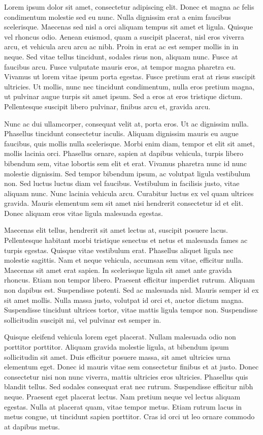 \documentclass[sigconf]{acmart}
\begin{document}
Lorem ipsum dolor sit amet, consectetur adipiscing elit. Donec et magna ac felis condimentum molestie sed eu nunc. Nulla dignissim erat a enim faucibus scelerisque. Maecenas sed nisl a orci aliquam tempus sit amet et ligula. Quisque vel rhoncus odio. Aenean euismod, quam a suscipit placerat, nisl eros viverra arcu, et vehicula arcu arcu ac nibh. Proin in erat ac est semper mollis in in neque. Sed vitae tellus tincidunt, sodales risus non, aliquam nunc. Fusce at faucibus arcu. Fusce vulputate mauris eros, at tempor magna pharetra eu. Vivamus ut lorem vitae ipsum porta egestas. Fusce pretium erat at risus suscipit ultricies. Ut mollis, nunc nec tincidunt condimentum, nulla eros pretium magna, ut pulvinar augue turpis sit amet ipsum. Sed a eros at eros tristique dictum. Pellentesque suscipit libero pulvinar, finibus arcu et, gravida arcu.

Nunc ac dui ullamcorper, consequat velit at, porta eros. Ut ac dignissim nulla. Phasellus tincidunt consectetur iaculis. Aliquam dignissim mauris eu augue faucibus, quis mollis nulla scelerisque. Morbi enim diam, tempor et elit sit amet, mollis lacinia orci. Phasellus ornare, sapien at dapibus vehicula, turpis libero bibendum sem, vitae lobortis sem elit et erat. Vivamus pharetra nunc id nunc molestie dignissim. Sed tempor bibendum ipsum, ac volutpat ligula vestibulum non. Sed luctus luctus diam vel faucibus. Vestibulum in facilisis justo, vitae aliquam nunc. Nunc lacinia vehicula arcu. Curabitur luctus ex vel quam ultrices gravida. Mauris elementum sem sit amet nisi hendrerit consectetur id et elit. Donec aliquam eros vitae ligula malesuada egestas.

Maecenas elit tellus, hendrerit sit amet lectus at, suscipit posuere lacus. Pellentesque habitant morbi tristique senectus et netus et malesuada fames ac turpis egestas. Quisque vitae vestibulum erat. Phasellus aliquet ligula nec molestie sagittis. Nam et neque vehicula, accumsan sem vitae, efficitur nulla. Maecenas sit amet erat sapien. In scelerisque ligula sit amet ante gravida rhoncus. Etiam non tempor libero. Praesent efficitur imperdiet rutrum. Aliquam non dapibus est. Suspendisse potenti. Sed ac malesuada nisl. Mauris semper id ex sit amet mollis. Nulla massa justo, volutpat id orci et, auctor dictum magna. Suspendisse tincidunt ultrices tortor, vitae mattis ligula tempor non. Suspendisse sollicitudin suscipit mi, vel pulvinar est semper in.

Quisque eleifend vehicula lorem eget placerat. Nullam malesuada odio non porttitor porttitor. Aliquam gravida molestie ligula, at bibendum ipsum sollicitudin sit amet. Duis efficitur posuere massa, sit amet ultricies urna elementum eget. Donec id mauris vitae sem consectetur finibus et at justo. Donec consectetur nisi non nunc viverra, mattis ultricies eros ultricies. Phasellus quis blandit tellus. Sed sodales consequat erat nec rutrum. Suspendisse efficitur nibh neque. Praesent eget placerat lectus. Nam pretium neque vel lectus aliquam egestas. Nulla at placerat quam, vitae tempor metus. Etiam rutrum lacus in metus congue, ut tincidunt sapien porttitor. Cras id orci ut leo ornare commodo at dapibus metus.
\end{document}
